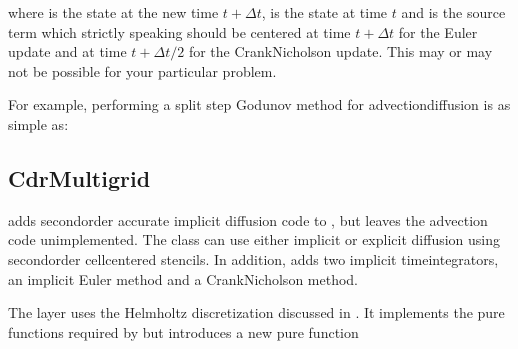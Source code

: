 \documentclass[letterpaper,10pt,english]{sphinxmanual}
\begin{document}
where  is the state at the new time \(t + \Delta t\),  is the state at time \(t\) and  is the source term which strictly speaking should be centered at time \(t + \Delta t\) for the Euler update and at time \(t + \Delta t/2\) for the Crank\sphinxhyphen{}Nicholson update.
This may or may not be possible for your particular problem.

For example, performing a split step Godunov method for advection\sphinxhyphen{}diffusion is as simple as:

\begin{sphinxVerbatim}[commandchars=\\\{\},formatcom=\scriptsize]
  
  

 
  
\end{sphinxVerbatim}


\subsection{CdrMultigrid}
\label{\detokenize{Solvers/CDR:cdrmultigrid}}\label{\detokenize{Solvers/CDR:chap-cdrmultigrid}}
 adds second\sphinxhyphen{}order accurate implicit diffusion code to , but leaves the advection code unimplemented.
The class can use either implicit or explicit diffusion using second\sphinxhyphen{}order cell\sphinxhyphen{}centered stencils.
In addition,  adds two implicit time\sphinxhyphen{}integrators, an implicit Euler method and a Crank\sphinxhyphen{}Nicholson method.

The  layer uses the Helmholtz discretization discussed in {\hyperref[\detokenize{Source/LinearSolvers:chap-helmholtz}]{}}.
It implements the pure functions required by {\hyperref[\detokenize{Solvers/CDR:chap-cdrsolver}]{}} but introduces a new pure function
\end{document}
